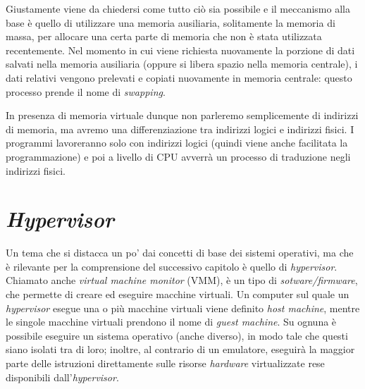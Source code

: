 Giustamente viene da chiedersi come tutto ciò sia possibile e il meccanismo alla base è quello di utilizzare una memoria ausiliaria, solitamente la memoria di massa, per allocare una certa parte di memoria che non è stata utilizzata recentemente. Nel momento in cui viene richiesta nuovamente la porzione di dati salvati nella memoria ausiliaria (oppure si libera spazio nella memoria centrale), i dati relativi vengono prelevati e copiati nuovamente in memoria centrale: questo processo prende il nome di \textit{swapping}. 

In presenza di memoria virtuale dunque non parleremo semplicemente di indirizzi di memoria, ma avremo una differenziazione tra indirizzi logici e indirizzi fisici. I programmi lavoreranno solo con indirizzi logici (quindi viene anche facilitata la programmazione) e poi a livello di CPU avverrà un processo di traduzione negli indirizzi fisici.

\section{\textit{\uppercase{h}ypervisor}}
Un tema che si distacca un po' dai concetti di base dei sistemi operativi, ma che è rilevante per la comprensione del successivo capitolo è quello di \textit{hypervisor}. Chiamato anche \textit{virtual machine monitor} (VMM), è un tipo di \textit{sotware/firmware}, che permette di creare ed eseguire macchine virtuali. Un computer sul quale un \textit{hypervisor} esegue una o più macchine virtuali viene definito \textit{host machine}, mentre le singole macchine virtuali prendono il nome di \textit{guest machine}. Su ognuna è possibile eseguire un sistema operativo (anche diverso), in modo tale che questi siano isolati tra di loro; inoltre, al contrario di un emulatore, eseguirà la maggior parte delle istruzioni direttamente sulle risorse \textit{hardware} virtualizzate rese disponibili dall'\textit{hypervisor}.